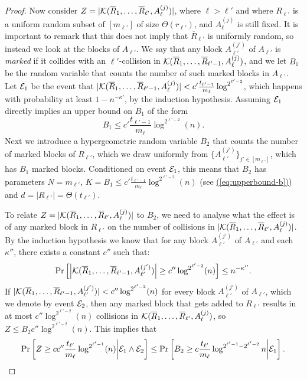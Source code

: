 \documentclass{article}
\newcommand{\eq}[1]{\hyperref[eq:#1]{(\ref*{eq:#1})}}
\renewcommand{\>}{\rangle}
\newcommand{\<}{\langle}
\renewcommand{\(}{\left(}
\renewcommand{\)}{\right)}
\def\abs#1{\left| #1 \right|}
\begin{document}
\begin{proof}
Now consider $Z = |{\cal K}(\overline{R}_1,\dots,\overline{R}_{\ell'},A_{\ell}^{(j)})|$, where $\ell > \ell'$ and where $R_{\ell'}$ is a uniform random subset of $[m_{\ell'}]$ of size $\Theta(r_{\ell'})$, and $A_{\ell}^{(j)}$ is still fixed. It is important to remark that this does not imply that $\overline{R}_{\ell'}$ is uniformly random, so instead we look at the blocks of $A_{\ell'}$. We say that any block $A_{\ell'}^{(j')}$ of $A_{\ell'}$ is \emph{marked} if it collides with an $\ell'$-collision in ${\cal K}(\overline{R}_1,\dots,\overline{R}_{\ell'-1},A_{\ell}^{(j)})$, and we let $B_1$ be the random variable that counts the number of such marked blocks in $A_{\ell'}$. Let ${\cal E}_1$ be the event that $|{\cal K}(\overline{R}_1,\dots,\overline{R}_{\ell'-1},A_{\ell}^{(j)})| <  c'\frac{t_{\ell'-1}}{m_{\ell}}\log^{2^{\ell'-2}}$, which happens with probability at least $1-n^{-\kappa'}$, by the induction hypothesis. Assuming ${\cal E}_1$ directly implies an upper bound on $B_1$ of the form 
\begin{equation}\label{eq:upperbound-b}
	B_1\leq c'\frac{t_{\ell'-1}}{m_{\ell}}\log^{2^{\ell'-2}} (n).
\end{equation}
Next we introduce a hypergeometric random variable $B_2$ that counts the number of marked blocks of $R_{\ell'}$, which we draw uniformly from $\{A_{\ell'}^{(j')}\}_{j'\in [m_{\ell'}]}$, which has $B_1$ marked blocks. Conditioned on event ${\cal E}_1$, this means that $B_2$ has parameters $N = m_{\ell'}$, $K = B_1 \leq c'\frac{t_{\ell'-1}}{m_{\ell}}\log^{2^{\ell'-2}} (n)$ (see \eq{upperbound-b}) and $d=|R_{\ell'}|=\Theta(t_{\ell'})$.

To relate $Z = |{\cal K}(\overline{R}_1,\dots,\overline{R}_{\ell'},A_{\ell}^{(j)})|$ to $B_2$, we need to analyse what the effect is of any marked block in $R_{\ell'}$ on the number of collisions in $|{\cal K}(\overline{R}_1,\dots,\overline{R}_{\ell'},A_{\ell}^{(j)})|$. By the induction hypothesis we know that for any block $A_{\ell'}^{(j')}$ of $A_{\ell'}$ and each $\kappa''$, there exists a constant $c''$ such that:
$$\Pr\left[\abs{{\cal K}(\overline{R}_1,\dots,\overline{R}_{\ell'-1},A_{\ell'}^{(j')})}\geq c''\log^{2^{\ell'-2}} (n)\right]\leq n^{-\kappa''}.$$  
If $|{\cal K}(\overline{R}_1,\dots,\overline{R}_{\ell'-1},A_{\ell'}^{(j')})| <  c''\log^{2^{\ell'-2}} (n)$ for every block $A_{\ell'}^{(j')}$ of $A_{\ell'}$, which we denote by event ${\cal E}_2$, then any marked block that gets added to $R_{\ell'}$ results in at most $c''\log^{2^{\ell'-2}} (n)$ collisions in ${\cal K}(\overline{R}_1,\dots,\overline{R}_{\ell'},A_{\ell}^{(j)})$, so $Z \leq B_2c''\log^{2^{\ell'-2}}(n) $. This implies that
\begin{equation}\label{eq:Z-B}
	\Pr\left[Z \geq cc''\frac{t_{\ell'}}{m_{\ell}}\log^{2^{\ell'-1}} (n)\middle| {\cal E}_1 \wedge {\cal E}_2 \right] \leq \Pr\left[B_2 \geq c\frac{t_{\ell'}}{m_{\ell}}\log^{2^{\ell'-1}-2^{\ell'-2}} n\middle| {\cal E}_1\right].
\end{equation}


\end{proof}
\end{document}

